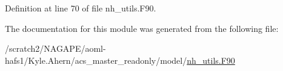 Definition at line 70 of file nh\-\_\-utils.\-F90.



The documentation for this module was generated from the following file\-:\begin{DoxyCompactItemize}
\item 
/scratch2/\-N\-A\-G\-A\-P\-E/aoml-\/hafs1/\-Kyle.\-Ahern/acs\-\_\-master\-\_\-readonly/model/\hyperlink{nh__utils_8F90}{nh\-\_\-utils.\-F90}\end{DoxyCompactItemize}
